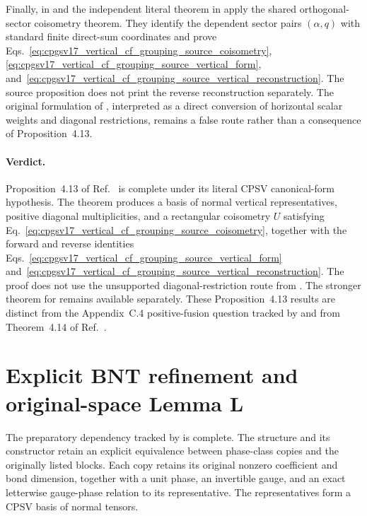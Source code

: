 \documentclass{article}
\begin{document}
Finally,  in
 and the independent literal
theorem  in
 apply the shared
orthogonal-sector coisometry theorem. They identify the dependent sector pairs
$(\alpha,q)$ with standard finite direct-sum coordinates and prove
Eqs.~\ref{eq:cpgsv17_vertical_cf_grouping_source_coisometry},
\ref{eq:cpgsv17_vertical_cf_grouping_source_vertical_form},
and~\ref{eq:cpgsv17_vertical_cf_grouping_source_vertical_reconstruction}. The
source proposition does not print the reverse reconstruction separately. The
original formulation of , interpreted as a direct conversion of
horizontal scalar weights and diagonal restrictions, remains a false route
rather than a consequence of Proposition~4.13.

\paragraph{Verdict.}
Proposition~4.13 of Ref.~\cite{Cirac2016MPDO_arXiv} is complete under its
literal CPSV canonical-form hypothesis. The theorem
 produces a basis of normal
vertical representatives, positive diagonal multiplicities, and a rectangular
coisometry $U$ satisfying
Eq.~\ref{eq:cpgsv17_vertical_cf_grouping_source_coisometry}, together with
the forward and reverse identities
Eqs.~\ref{eq:cpgsv17_vertical_cf_grouping_source_vertical_form}
and~\ref{eq:cpgsv17_vertical_cf_grouping_source_vertical_reconstruction}. The
proof does not use the unsupported diagonal-restriction route from
. The stronger theorem for
 remains available separately. These
Proposition~4.13 results are distinct from the Appendix~C.4 positive-fusion
question tracked by  and from Theorem~4.14 of
Ref.~\cite{Cirac2016MPDO_arXiv}.

\section{Explicit BNT refinement and original-space Lemma L}

The preparatory dependency tracked by  is complete. The structure
 and its constructor
 retain an explicit
equivalence between phase-class copies and the originally listed blocks. Each
copy retains its original nonzero coefficient and bond dimension, together
with a unit phase, an invertible gauge, and an exact letterwise gauge-phase
relation to its representative. The representatives form a CPSV basis of
normal tensors.
\end{document}
